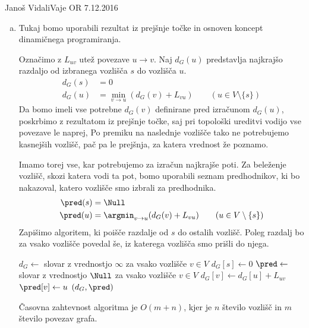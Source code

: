 \begin{naloga}{Janoš Vidali}{Vaje OR 7.12.2016}
\begin{odgovor}
\begin{enumerate}[(a)]
Klic {\sc Topo}$(G)$ nam vrne ureditev vozlišč $[g, a, h, b, c, f, d, e]$.

\item Tukaj bomo uporabili rezultat iz prejšnje točke
in osnoven koncept dinamičnega programiranja.

Označimo z $L_{uv}$ utež povezave $u \rightarrow v$.
Naj $d_G(u)$ predstavlja najkrajšo razdaljo
od izbranega vozlišča $s$ do vozlišča $u$.
\begin{align*}
d_G(s) &= 0 \\
d_G(u) &= \min_{v \rightarrow u}(d_G(v) + L_{vu})
\qquad (u \in V \setminus \{s\})
\end{align*}
Da bomo imeli vse potrebne $d_G(v)$ definirane pred izračunom $d_G(u)$,
poskrbimo z rezultatom iz prejšnje točke,
saj pri topološki ureditvi vodijo vse povezave le naprej,
Po premiku na naslednje vozlišče tako ne potrebujemo kasnejših vozlišč,
pač pa le prejšnja, za katera vrednost že poznamo.

Imamo torej vse, kar potrebujemo za izračun najkrajše poti.
Za beleženje vozlišč, skozi katera vodi ta pot,
bomo uporabili seznam predhodnikov,
ki bo nakazoval, katero vozlišče smo izbrali za predhodnika.
\begin{align*}
\pred(s) &= \Null \\
\pred(u) &= \argmin_{v \rightarrow u}(d_G(v) + L_{vu})
\qquad (u \in V \setminus \{s\})
\end{align*}
Zapišimo algoritem, ki poišče razdalje od $s$ do ostalih vozlišč.
Poleg razdalj bo za vsako vozlišče povedal še,
iz katerega vozlišča smo prišli do njega.
\begin{small}
\begin{algorithmic}
	\State $d_G \gets$ slovar z vrednostjo $\infty$ za vsako vozlišče $v \in V$
	\State $d_G[s] \gets 0$
	\State $\pred \gets$ slovar z vrednostjo $\Null$ za vsako vozlišče $v \in V$
				\State $d_G[v] \gets d_G[u] + L_{uv}$
				\State $\pred[v] \gets u$
			\EndIf
		\EndFor
	\EndFor
    \State \Return $(d_G, \pred)$
\EndFunction
\end{algorithmic}
\end{small}
Časovna zahtevnost algoritma je $O(m + n)$,
kjer je $n$ število vozlišč in $m$ število povezav grafa.


\end{enumerate}
\end{odgovor}
\end{naloga}
